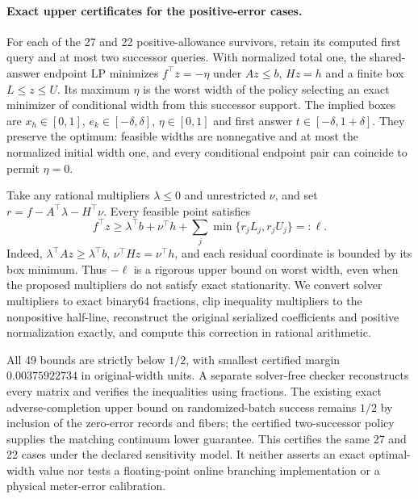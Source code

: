 \paragraph{Exact upper certificates for the positive-error cases.}
For each of the 27 and 22 positive-allowance survivors, retain its computed
first query and at most two successor queries. With normalized total one,
the shared-answer endpoint LP minimizes $f^\top z=-\eta$ under
$Az\leq b$, $Hz=h$ and a finite box $L\leq z\leq U$.
Its maximum $\eta$ is the worst width of the policy selecting an exact
minimizer of conditional width from this successor support.
The implied boxes are $x_h\in[0,1]$, $e_k\in[-\delta,\delta]$,
$\eta\in[0,1]$ and first answer $t\in[-\delta,1+\delta]$.
They preserve the optimum: feasible widths are nonnegative and at most the
normalized initial width one, and every conditional endpoint pair can
coincide to permit $\eta=0$.

Take any rational multipliers $\lambda\leq0$ and unrestricted $\nu$, and set
$r=f-A^\top\lambda-H^\top\nu$. Every feasible point satisfies
\[
 f^\top z\geq \lambda^\top b+\nu^\top h+
       \sum_j\min\{r_jL_j,r_jU_j\}=:\ell.
\]
Indeed, $\lambda^\top Az\geq\lambda^\top b$,
$\nu^\top Hz=\nu^\top h$, and each residual coordinate is bounded by
its box minimum. Thus $-\ell$ is a rigorous upper bound on worst width,
even when the proposed multipliers do not satisfy exact stationarity.
We convert solver multipliers to exact binary64 fractions, clip inequality
multipliers to the nonpositive half-line, reconstruct the original serialized
coefficients and positive normalization exactly, and compute this correction
in rational arithmetic.

All 49 bounds are strictly below $1/2$, with smallest certified margin
$0.00375922734$ in original-width units. A separate solver-free checker
reconstructs every matrix and verifies the inequalities using fractions.
The existing exact adverse-completion upper bound on randomized-batch
success remains $1/2$ by inclusion of the zero-error records and fibers;
the certified two-successor policy supplies the matching continuum lower
guarantee. This certifies the same 27 and 22 cases under the declared
sensitivity model. It neither asserts an exact optimal-width value nor
tests a floating-point online branching implementation or a physical
meter-error calibration.

